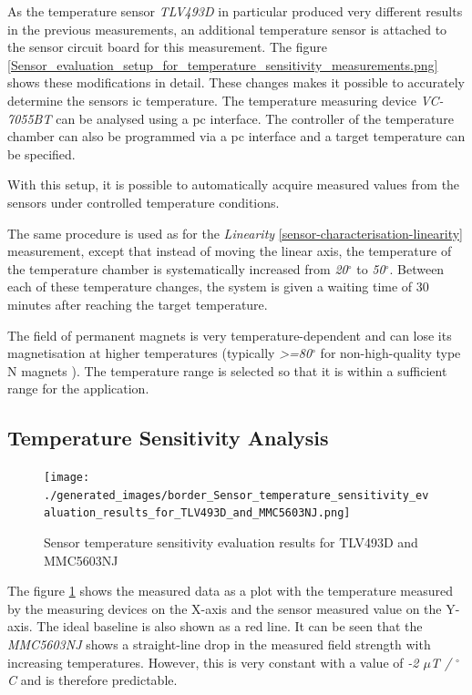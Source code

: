 As the temperature sensor \emph{TLV493D} in particular produced very
different results in the previous measurements, an additional
temperature sensor is attached to the sensor circuit board for this
measurement. The figure
\ref{Sensor_evaluation_setup_for_temperature_sensitivity_measurements.png}
shows these modifications in detail. These changes makes it possible to
accurately determine the sensors \gls{ic} temperature. The temperature
measuring device \emph{VC-7055BT} can be analysed using a \gls{pc}
interface. The controller of the temperature chamber can also be
programmed via a \gls{pc} interface and a target temperature can be
specified.

With this setup, it is possible to automatically acquire measured values
from the sensors under controlled temperature conditions.

The same procedure is used as for the \emph{Linearity}
\ref{sensor-characterisation-linearity} measurement, except that instead
of moving the linear axis, the temperature of the temperature chamber is
systematically increased from \emph{20\(^{\circ}\)} to
\emph{50\(^{\circ}\)}. Between each of these temperature changes, the
system is given a waiting time of 30 minutes after reaching the target
temperature.

The field of permanent magnets is very temperature-dependent and can
lose its magnetisation at higher temperatures (typically
\emph{\textgreater=80\(^{\circ}\)} for non-high-quality type N magnets
\cite{magna-c}). The temperature range is selected so that it is
within a sufficient range for the application.

\hypertarget{temperature-sensitivity-analysis}{%
\subsection{Temperature Sensitivity
Analysis}\label{temperature-sensitivity-analysis}}

\begin{figure}
\centering
\texttt{[image: ./generated\_images/border\_Sensor\_temperature\_sensitivity\_evaluation\_results\_for\_TLV493D\_and\_MMC5603NJ.png]}
\caption{Sensor temperature sensitivity evaluation results for TLV493D
and MMC5603NJ
\label{Sensor_temperature_sensitivity_evaluation_results_for_TLV493D_and_MMC5603NJ.png}}
\end{figure}

The figure
\ref{Sensor_temperature_sensitivity_evaluation_results_for_TLV493D_and_MMC5603NJ.png}
shows the measured data as a plot with the temperature measured by the
measuring devices on the X-axis and the sensor measured value on the
Y-axis. The ideal baseline is also shown as a red line. It can be seen
that the \emph{MMC5603NJ} shows a straight-line drop in the measured
field strength with increasing temperatures. However, this is very
constant with a value of \emph{-2 \(\mu\)T / \(^{\circ}\)C} and is
therefore predictable.

